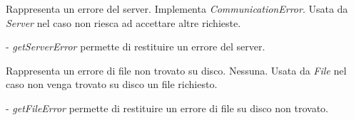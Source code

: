 Rappresenta un errore del server.
Implementa \textit{CommunicationError}.
Usata da \textit{Server} nel caso non riesca ad accettare altre richieste.
\begin{elencopuntato}[\normindent]
\item[-] \textit{getServerError} permette di restituire un errore del server.
\end{elencopuntato}

Rappresenta un errore di file non trovato su disco.
Nessuna.
Usata da \textit{File} nel caso non venga trovato su disco un file richiesto.
\begin{elencopuntato}[\normindent]
\item[-] \textit{getFileError} permette di restituire un errore di file su disco non trovato.
\end{elencopuntato}

